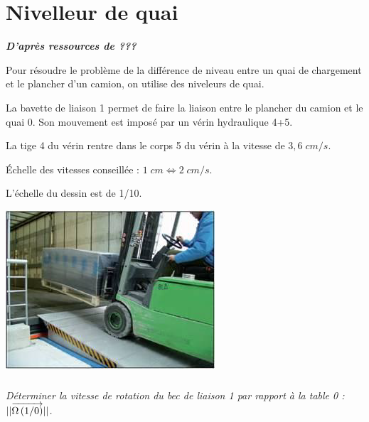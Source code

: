 \documentclass[10pt,fleqn]{article} %
\begin{document}

\vspace{5cm}
\pagestyle{fancy}
\thispagestyle{plain}


\def\columnseprulecolor{\color{ocre}}
\setlength{\columnseprule}{0.4pt} 

\begin{flushright}

\end{flushright}

 \renewcommand{\baselinestretch}{1.2}

\section{Nivelleur de quai}
\begin{flushright}
\textbf{\textit{D'après ressources de ???}}
\end{flushright} 
\setcounter{exo}{0}
\begin{minipage}[c]{.45\linewidth}
Pour résoudre le problème de la différence de niveau entre un quai 
de chargement et le plancher d'un camion, on utilise des niveleurs de 
quai.

La bavette de liaison 1 permet de faire la liaison entre le plancher du 
camion  et le quai 0. Son mouvement est imposé par un vérin 
hydraulique 4+5.

La tige  4  du vérin rentre dans le corps 5 du vérin  à la vitesse de 
$3,6\;cm/s$.

Échelle des vitesses conseillée : $1\;cm \Longleftrightarrow 2\;cm/s$.

L’échelle du dessin est de 1/10.

\end{minipage}\hfill
\begin{minipage}[c]{.45\linewidth}

\begin{center}
\includegraphics[width=.8\textwidth]{images/fig4_1}
\end{center}
\end{minipage}
\subparagraph{}
\textit{Déterminer la vitesse de rotation du bec de liaison 1 par rapport à la table 0 : $||\overrightarrow{\Omega\left( {1}/{0}\right)}||$.}
\end{document}
